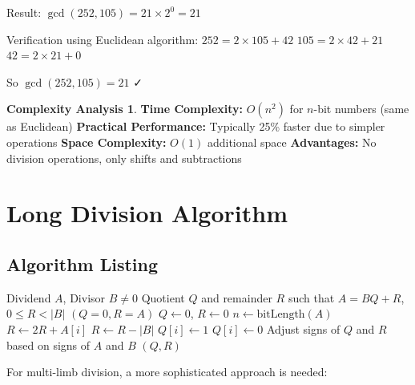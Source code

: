 \documentclass[12pt,a4paper]{article}
\theoremstyle{definition}
\newtheorem{complexity}{Complexity Analysis}[section]
\begin{document}
Result: $\gcd(252, 105) = 21 \times 2^0 = 21$

Verification using Euclidean algorithm:
$252 = 2 \times 105 + 42$
$105 = 2 \times 42 + 21$  
$42 = 2 \times 21 + 0$

So $\gcd(252, 105) = 21$ ✓

\begin{complexity}
\textbf{Time Complexity:} $O(n^2)$ for $n$-bit numbers (same as Euclidean)
\textbf{Practical Performance:} Typically 25\% faster due to simpler operations
\textbf{Space Complexity:} $O(1)$ additional space
\textbf{Advantages:} No division operations, only shifts and subtractions
\end{complexity}

\section{Long Division Algorithm}

\subsection{Algorithm Listing}

\begin{algorithm}[H]
\caption{Long Division for Big Integers}
\label{alg:long-division}
\begin{algorithmic}[1]
\REQUIRE Dividend $A$, Divisor $B \neq 0$
\ENSURE Quotient $Q$ and remainder $R$ such that $A = BQ + R$, $0 \leq R < |B|$
    \RETURN $(Q = 0, R = A)$
\ENDIF
\STATE $Q \leftarrow 0$, $R \leftarrow 0$
\STATE $n \leftarrow \text{bitLength}(A)$
    \STATE $R \leftarrow 2R + A[i]$ 
        \STATE $R \leftarrow R - |B|$
        \STATE $Q[i] \leftarrow 1$
    \ELSE
        \STATE $Q[i] \leftarrow 0$
    \ENDIF
\ENDFOR
\STATE Adjust signs of $Q$ and $R$ based on signs of $A$ and $B$
\RETURN $(Q, R)$
\end{algorithmic}
\end{algorithm}

For multi-limb division, a more sophisticated approach is needed:
\end{document}
